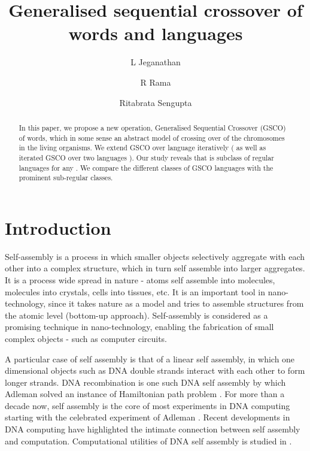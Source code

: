\documentclass{llncs}
\begin{document}
\title{ Generalised sequential crossover of words and languages}
\author{L Jeganathan \and R Rama \and Ritabrata Sengupta}
\maketitle
\begin{abstract}
In this paper, we propose a new operation, Generalised Sequential
Crossover (GSCO) of words, which in some sense an abstract model of
crossing over of the chromosomes  in the living organisms. We extend
GSCO over language  iteratively ( as well as iterated
GSCO over two languages ). Our study reveals that
 is subclass of regular languages for any . We compare
the different classes of GSCO languages with the prominent
sub-regular classes. \end{abstract}
\section{Introduction}

\par Self-assembly is a process in which smaller objects selectively
aggregate with each other into a complex structure, which in turn
self assemble into larger aggregates. It is a process wide spread in
nature - atoms self assemble into molecules, molecules into
crystals, cells into
 tissues, etc. It is an important tool  in nano-technology, since it takes
 nature as a model and tries to assemble structures from the atomic level
 (bottom-up approach). Self-assembly is considered as a promising technique
 in nano-technology, enabling the fabrication of small complex objects - such
 as computer circuits.

\par A particular case of self assembly is that of a linear self assembly,
 in which one dimensional objects such as DNA double strands interact with
  each other to form  longer strands. DNA recombination is  one such DNA
   self assembly by which Adleman solved an instance of Hamiltonian path
   problem \cite{Ad}. For more than a decade now, self assembly is the
   core of most experiments in DNA computing starting with the celebrated
   experiment of Adleman \cite{Ad,FCL,OK}. Recent developments in DNA computing
    have highlighted the intimate connection between self assembly and computation.
     Computational utilities of DNA self  assembly is studied in \cite{Win}.
\end{document}

